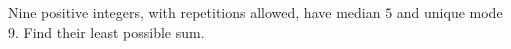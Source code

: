 Nine positive integers, with repetitions allowed, have median $5$ and unique mode $9$. Find their least possible sum.
